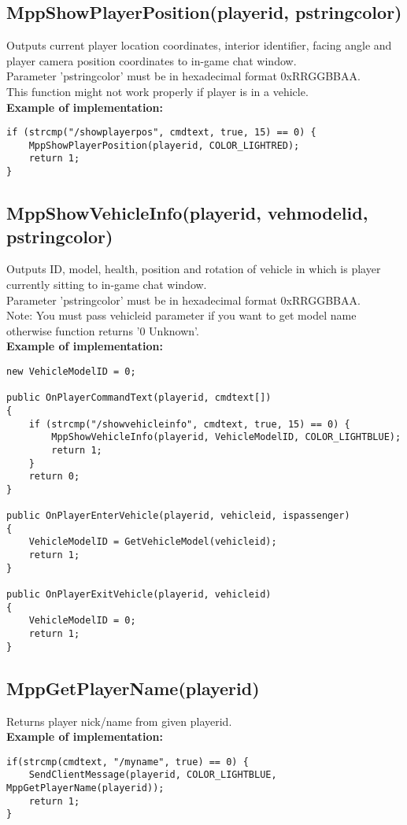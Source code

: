 \documentclass{article}
\begin{document}
\newpage
\subsection{MppShowPlayerPosition(playerid, pstringcolor)}
Outputs current player location coordinates, interior identifier, facing angle and player camera position coordinates to in-game chat window.
\\Parameter 'pstringcolor' must be in hexadecimal format 0xRRGGBBAA.
\\This function might not work properly if player is in a vehicle.
\bigskip
\\\textbf{Example of implementation:}
\begin{verbatim}
if (strcmp("/showplayerpos", cmdtext, true, 15) == 0) {
    MppShowPlayerPosition(playerid, COLOR_LIGHTRED);
    return 1;
}
\end{verbatim}

\subsection{MppShowVehicleInfo(playerid, vehmodelid, pstringcolor)}
Outputs ID, model, health, position and rotation of vehicle in which is player currently sitting to in-game chat window.
\\Parameter 'pstringcolor' must be in hexadecimal format 0xRRGGBBAA.
\\Note: You must pass vehicleid parameter if you want to get model name otherwise function returns '0 Unknown'.
\bigskip
\\\textbf{Example of implementation:}
\begin{verbatim}
new VehicleModelID = 0;

public OnPlayerCommandText(playerid, cmdtext[])
{
    if (strcmp("/showvehicleinfo", cmdtext, true, 15) == 0) {
        MppShowVehicleInfo(playerid, VehicleModelID, COLOR_LIGHTBLUE);
        return 1;
    }
    return 0;
}

public OnPlayerEnterVehicle(playerid, vehicleid, ispassenger)
{
    VehicleModelID = GetVehicleModel(vehicleid);
    return 1;
}

public OnPlayerExitVehicle(playerid, vehicleid)
{
    VehicleModelID = 0;
    return 1;
}
\end{verbatim}

\subsection{MppGetPlayerName(playerid)}
Returns player nick/name from given playerid.
\bigskip
\\\textbf{Example of implementation:}
\begin{verbatim}
if(strcmp(cmdtext, "/myname", true) == 0) {
    SendClientMessage(playerid, COLOR_LIGHTBLUE, MppGetPlayerName(playerid));
    return 1;
}
\end{verbatim}
\end{document}
